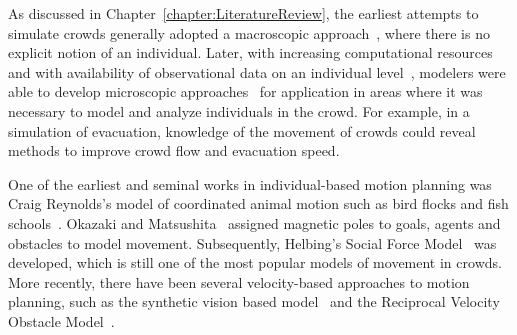
As discussed in Chapter~\ref{chapter:LiteratureReview}, the earliest attempts to simulate crowds generally adopted a macroscopic approach~\cite{Henderson:1974ve,WattsJr:1987tx}, where there is no explicit notion of an individual.
Later, with increasing computational resources and with availability of observational data on an individual level~\cite{CGF:CGF1090, HuNan2013, JOHANSSON2008}, modelers were able to develop microscopic approaches~\cite{Reynolds:1987vm,PhysRevE.51.4282} for application in areas where it was necessary to model and analyze individuals in the crowd.
For example, in a simulation of evacuation, knowledge of the movement of crowds could reveal methods to improve crowd flow and evacuation speed.

One of the earliest and seminal works in individual-based motion planning was Craig Reynolds's model of coordinated animal motion such as bird flocks and fish schools~\cite{Reynolds:1987vm}. Okazaki and Matsushita~\cite{Okazaki:1993wh} assigned magnetic poles to goals, agents and obstacles to model movement. Subsequently, Helbing's Social Force Model~\cite{PhysRevE.51.4282} was developed, which is still one of the most popular models of movement in crowds. More recently, there have been several velocity-based approaches to motion planning, such as the synthetic vision based model~\cite{Ondrej:2010hv} and the Reciprocal Velocity Obstacle Model~\cite{vandenBerg:2011ww,Guy:2010ko,vandenBerg:2008fu}.


